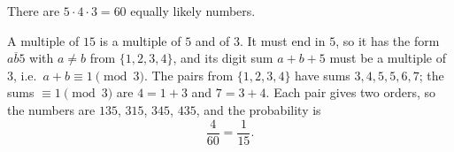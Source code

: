 There are $5\cdot4\cdot3=60$ equally likely numbers.

A multiple of $15$ is a multiple of $5$ and of $3$. It must end in $5$, so it has the form $\overline{ab5}$ with $a\ne b$ from $\{1,2,3,4\}$, and its digit sum $a+b+5$ must be a multiple of $3$, i.e.\ $a+b\equiv1\pmod3$. The pairs from $\{1,2,3,4\}$ have sums $3,4,5,5,6,7$; the sums $\equiv1\pmod 3$ are $4=1+3$ and $7=3+4$. Each pair gives two orders, so the numbers are $135$, $315$, $345$, $435$, and the probability is
\[
\dfrac{4}{60}=\boxed{\dfrac{1}{15}}.
\]
